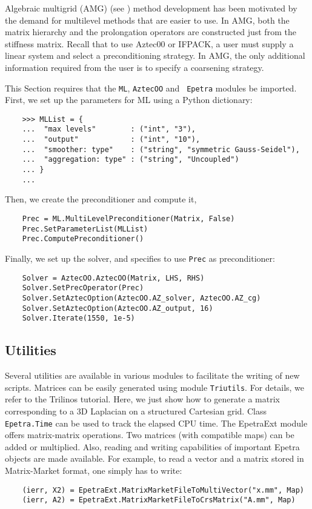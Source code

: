 \documentclass[10pt,relax]{SANDreport}
\begin{document}
Algebraic multigrid (AMG) (see \cite[Section 8]{Briggs}) method
development has been motivated by the demand for multilevel methods
that are easier to use.  In AMG, both the matrix hierarchy and the
prolongation operators are constructed just from the stiffness matrix.
Recall that to use Aztec00 or IFPACK, a user must supply a linear
system and select a preconditioning strategy.  In AMG, the only
additional information required from the user is to specify a
coarsening strategy.

This Section requires that the {\tt ML}, {\tt AztecOO} and {\tt
  Epetra} modules be imported. First, we set up the parameters for ML
using a Python dictionary:
\begin{verbatim}
    >>> MLList = {
    ...  "max levels"        : ("int", "3"),
    ...  "output"            : ("int", "10"),
    ...  "smoother: type"    : ("string", "symmetric Gauss-Seidel"),
    ...  "aggregation: type" : ("string", "Uncoupled")
    ... }
    ...
\end{verbatim}
Then, we create the preconditioner and compute it,
\begin{verbatim}
    Prec = ML.MultiLevelPreconditioner(Matrix, False)
    Prec.SetParameterList(MLList)
    Prec.ComputePreconditioner()
\end{verbatim}
Finally, we set up the solver, and specifies to use {\tt Prec} as
preconditioner:
\begin{verbatim}
    Solver = AztecOO.AztecOO(Matrix, LHS, RHS)
    Solver.SetPrecOperator(Prec)
    Solver.SetAztecOption(AztecOO.AZ_solver, AztecOO.AZ_cg)
    Solver.SetAztecOption(AztecOO.AZ_output, 16)
    Solver.Iterate(1550, 1e-5)
\end{verbatim}

\subsection{Utilities}
\label{subsec:utilities}

Several utilities are available in various modules to facilitate the
writing of new scripts.  Matrices can be easily generated using module
{\tt Triutils}. For details, we refer to the Trilinos tutorial. Here,
we just show how to generate a matrix corresponding to a 3D Laplacian
on a structured Cartesian grid.  Class {\tt Epetra.Time} can be used
to track the elapsed CPU time.  The EpetraExt module offers
matrix-matrix operations. Two matrices (with compatible maps) can be
added or multiplied. Also, reading and writing capabilities of
important Epetra objects are made available. For example, to read a
vector and a matrix stored in Matrix-Market format, one simply has to
write:
\begin{verbatim}
    (ierr, X2) = EpetraExt.MatrixMarketFileToMultiVector("x.mm", Map)
    (ierr, A2) = EpetraExt.MatrixMarketFileToCrsMatrix("A.mm", Map)
\end{verbatim}
\end{document}
